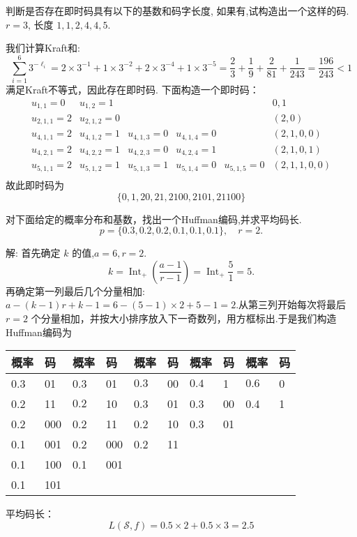\newpage
\begin{tcolorbox}[breakable,colback=blue!5!white,colframe=blue!75!black,
 title= 解答题]
 判断是否存在即时码具有以下的基数和码字长度, 如果有,试构造出一个这样的码.
$ r=3 $, 长度 $ 1,1,2,4,4,5 $.

\tcblower
我们计算Kraft和:
$$
\sum_{i=1}^{6} 3^{-\ell_{i}}=2 \times 3^{-1}+1 \times 3^{-2}+2 \times 3^{-4}+1 \times 3^{-5}=\frac{2}{3}+\frac{1}{9}+\frac{2}{81}+\frac{1}{243}=\frac{196}{243}<1
$$
满足Kraft不等式，因此存在即时码. 下面构造一个即时码：
$$
\begin{array}{llllll}
u_{1,1}=0 & u_{1,2}=1 & &&&0,1\\
u_{2,1,1}=2 & u_{2,1,2}=0 &&&& (2,0)  \\
u_{4,1,1}=2 & u_{4,1,2}=1 & u_{4,1,3}=0&u_{4,1,4}=0&&(2,1,0,0)  \\
u_{4,2,1}=2 & u_{4,2,2}=1 & u_{4,2,3}=0&u_{4,2,4}=1&&(2,1,0,1)  \\
u_{5,1,1}=2 & u_{5,1,2}=1 & u_{5,1,3}=1 & u_{5,1,4}=0& u_{5,1,5}=0& (2,1,1,0,0) \\
\end{array}
$$
故此即时码为
$$
\{0,1,20,21,2100,2101,21100\}
$$
\end{tcolorbox}


\begin{tcolorbox}[breakable,colback=blue!5!white,colframe=blue!75!black,
 title= 解答题]
对下面给定的概率分布和基数，找出一个Huffman编码,并求平均码长.
$$
p=\{0.3,0.2,0.2,0.1,0.1,0.1\}, \quad r=2 .
$$

\tcblower
解: 首先确定 $ {k} $ 的值,$a=6,r=2$.
$$
k=\operatorname{I n t}_{+}\left(\frac{a-1}{r-1}\right)=\operatorname{I n t}_{+}\frac{5}{1}=5.
$$
再确定第一列最后几个分量相加:$a-(k-1) r+k-1 =6-(5-1) \times 2+5-1=2 $.从第三列开始每次将最后 $r=2$ 个分量相加，并按大小排序放入下一奇数列，用方框标出.于是我们构造Huffman编码为

\begin{center}
    \begin{tabular}{ll||ll||ll||ll||ll}
\hline 概率 & 码 & 概率 & 码 & 概率 & 码 & 概率 & 码& 概率 & 码\\
\hline 0.3 & 01 & 0.3 &01 & $\boxed{0.3}$ & 00 &$\boxed{0.4}$ &1 &$\boxed{0.6}$ &0\\
0.2 & 11 & $\boxed{0.2}$ & 10 & 0.3 & 01 &0.3 &00 &0.4 &1  \\
0.2 & 000 & 0.2 & 11 & 0.2 & 10 &0.3 &01 & &  \\
0.1 & 001 & 0.2 & 000 &0.2 &11 & & & &  \\
0.1 & 100 & 0.1 & 001 & & & & & &  \\
0.1 & 101 & & & & & & & &  \\
\hline
\end{tabular}
\end{center}
平均码长：
$$ L(\mathscr{S}, f)=0.5\times 2+0.5 \times 3=2.5 $$
\end{tcolorbox}

 